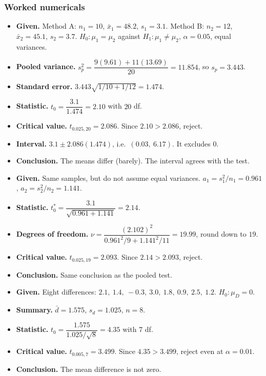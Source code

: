 \subsubsection*{Worked numericals}

\begin{example}
\begin{itemize}
  \item \textbf{Given.} Method A: $n_1=10$, $\bar{x}_1=48.2$, $s_1=3.1$. Method B: $n_2=12$, $\bar{x}_2=45.1$, $s_2=3.7$. $H_0:\mu_1=\mu_2$ against $H_1:\mu_1\ne\mu_2$, $\alpha=0.05$, equal variances.
  \item \textbf{Pooled variance.} $s_p^2=\dfrac{9(9.61)+11(13.69)}{20}=11.854$, so $s_p=3.443$.
  \item \textbf{Standard error.} $3.443\sqrt{1/10+1/12}=1.474$.
  \item \textbf{Statistic.} $t_0=\dfrac{3.1}{1.474}=2.10$ with $20$ df.
  \item \textbf{Critical value.} $t_{0.025,20}=2.086$. Since $2.10>2.086$, reject.
  \item \textbf{Interval.} $3.1\pm2.086(1.474)$, i.e.\ $(0.03,\ 6.17)$. It excludes $0$.
  \item \textbf{Conclusion.} The means differ (barely). The interval agrees with the test.
\end{itemize}
\end{example}

\begin{example}
\begin{itemize}
  \item \textbf{Given.} Same samples, but do not assume equal variances. $a_1=s_1^2/n_1=0.961$, $a_2=s_2^2/n_2=1.141$.
  \item \textbf{Statistic.} $t_0^*=\dfrac{3.1}{\sqrt{0.961+1.141}}=2.14$.
  \item \textbf{Degrees of freedom.} $\nu=\dfrac{(2.102)^2}{0.961^2/9+1.141^2/11}=19.99$, round down to $19$.
  \item \textbf{Critical value.} $t_{0.025,19}=2.093$. Since $2.14>2.093$, reject.
  \item \textbf{Conclusion.} Same conclusion as the pooled test.
\end{itemize}
\end{example}

\begin{example}
\begin{itemize}
  \item \textbf{Given.} Eight differences: $2.1,\ 1.4,\ -0.3,\ 3.0,\ 1.8,\ 0.9,\ 2.5,\ 1.2$. $H_0:\mu_D=0$.
  \item \textbf{Summary.} $\bar{d}=1.575$, $s_d=1.025$, $n=8$.
  \item \textbf{Statistic.} $t_0=\dfrac{1.575}{1.025/\sqrt8}=4.35$ with $7$ df.
  \item \textbf{Critical value.} $t_{0.005,7}=3.499$. Since $4.35>3.499$, reject even at $\alpha=0.01$.
  \item \textbf{Conclusion.} The mean difference is not zero.
\end{itemize}
\end{example}

